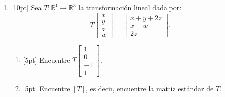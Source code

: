\documentclass[11pt]{article}
\begin{document}
\begin{enumerate}
\begin{enumerate}
\vspace{4pt}

\item{}[5pt] Encuentre la nulidad de $B$, es decir, encuentre la dimensión del espacio nulo de $B$.

\vspace{4pt}
\end{enumerate}

\item{}[10pt] Sea $T:\mathbb{R}^4\to\mathbb{R}^3$ la transformación lineal dada por:
\[
T\begin{bmatrix}x\\y\\z\\w\end{bmatrix} = \begin{bmatrix}x+y+2z\\x-w\\2z\end{bmatrix}.
\]
\begin{enumerate}
\item{}[5pt] Encuentre $T\begin{bmatrix}1\\0\\-1\\1\end{bmatrix}$.

\vspace{4pt}

\item{}[5pt] Encuentre $[T]$, es decir, encuentre la matriz estándar de $T$.

\vspace{4pt}
\fbox{\begin{minipage}[t][2.5cm]{\dimexpr\linewidth-2\fboxsep-2\fboxrule}
$[T] = $
\end{minipage}}
\end{enumerate}


\end{enumerate}
\end{document}
